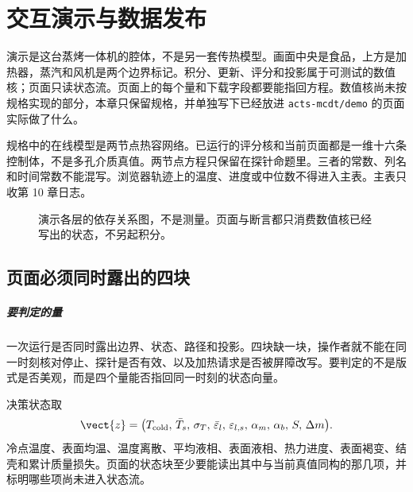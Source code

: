 \chapter{交互演示与数据发布}
\label{ch:demo}

演示是这台蒸烤一体机的腔体，不是另一套传热模型。画面中央是食品，上方是加热器，蒸汽和风机是两个边界标记。积分、更新、评分和投影属于可测试的数值核；页面只读状态流。页面上的每个量和下载字段都要能指回方程。数值核尚未按规格实现的部分，本章只保留规格，并单独写下已经放进 \texttt{acts-mcdt/demo} 的页面实际做了什么。

规格中的在线模型是两节点热容网络。已运行的评分核和当前页面都是一维十六条控制体，不是多孔介质真值。两节点方程只保留在探针命题里。三者的常数、列名和时间常数不能混写。浏览器轨迹上的温度、进度或中位数不得进入主表。主表只收第 10 章日志。

\begin{figure}[ht]
\centering
{}
\caption{演示各层的依存关系图，不是测量。页面与断言都只消费数值核已经写出的状态，不另起积分。}
\end{figure}

\section{页面必须同时露出的四块}

\paragraph{要判定的量}
一次运行是否同时露出边界、状态、路径和投影。四块缺一块，操作者就不能在同一时刻核对停止、探针是否有效、以及加热请求是否被屏障改写。要判定的不是版式是否美观，而是四个量能否指回同一时刻的状态向量。

决策状态取
\[
\vect{z}=\big(T_{\mathrm{cold}},\,\bar T_s,\,\sigma_T,\,\bar\varepsilon_l,\,\varepsilon_{l,s},\,\alpha_m,\,\alpha_b,\,S,\,\Delta m\big).
\]
冷点温度、表面均温、温度离散、平均液相、表面液相、热力进度、表面褐变、结壳和累计质量损失。页面的状态块至少要能读出其中与当前真值同构的那几项，并标明哪些项尚未进入状态流。

